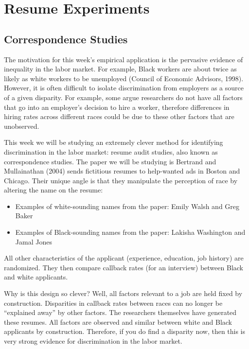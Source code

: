 \documentclass[
]{book}
\begin{document}
\chapter{Resume Experiments}\label{resume-experiments}

\section{Correspondence Studies}\label{correspondence-studies}

The motivation for this week's empirical application is the pervasive evidence of inequality in the labor market. For example, Black workers are about twice as likely as white workers to be unemployed (Council of Economic Advisors, 1998). However, it is often difficult to isolate discrimination from employers as a source of a given disparity. For example, some argue researchers do not have all factors that go into an employer's decision to hire a worker, therefore differences in hiring rates across different races could be due to these other factors that are unobserved.

This week we will be studying an extremely clever method for identifying discrimination in the labor market: resume audit studies, also known as correspondence studies. The paper we will be studying is Bertrand and Mullainathan (2004)\citep{bertrand2004emily} sends fictitious resumes to help-wanted ads in Boston and Chicago. Their unique angle is that they manipulate the perception of race by altering the name on the resume:

\begin{itemize}
\item
  Examples of white-sounding names from the paper: Emily Walsh and Greg Baker
\item
  Examples of Black-sounding names from the paper: Lakisha Washington and Jamal Jones
\end{itemize}

All other characteristics of the applicant (experience, education, job history) are randomized. They then compare callback rates (for an interview) between Black and white applicants.

Why is this design so clever? Well, all factors relevant to a job are held fixed by construction. Disparities in callback rates between races can no longer be ``explained away'' by other factors. The researchers themselves have generated these resumes. All factors are observed and similar between white and Black applicants by construction. Therefore, if you do find a disparity now, then this is very strong evidence for discrimination in the labor market.
\end{document}
